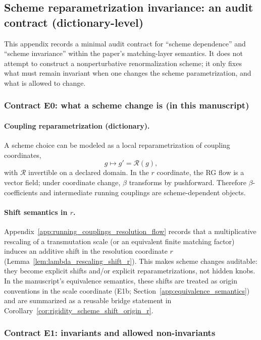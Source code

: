 \subsection{Scheme reparametrization invariance: an audit contract (dictionary-level)}
\label{app:scheme_invariance_audit_contract}

This appendix records a minimal audit contract for ``scheme dependence'' and ``scheme invariance'' within the paper's matching-layer semantics.
It does not attempt to construct a nonperturbative renormalization scheme; it only fixes what must remain invariant when one changes the scheme parametrization, and what is allowed to change.

\subsubsection{Contract E0: what a scheme change is (in this manuscript)}
\paragraph{Coupling reparametrization (dictionary).}
\MatchTag A scheme choice can be modeled as a local reparametrization of coupling coordinates,
\[
g \mapsto g'=\mathcal{R}(g),
\]
with $\mathcal{R}$ invertible on a declared domain.
In the $r$ coordinate, the RG flow is a vector field; under coordinate change, $\beta$ transforms by pushforward.
Therefore $\beta$-coefficients and intermediate running couplings are scheme-dependent objects.

\paragraph{Shift semantics in $r$.}
\MathTag Appendix~\ref{app:running_couplings_resolution_flow} records that a multiplicative rescaling of a transmutation scale (or an equivalent finite matching factor) induces an additive shift in the resolution coordinate $r$ (Lemma~\ref{lem:lambda_rescaling_shift_r}).
This makes scheme changes auditable: they become explicit shifts and/or explicit reparametrizations, not hidden knobs.
\AuditTag In the manuscript's equivalence semantics, these shifts are treated as origin conventions in the scale coordinate (E1b; Section~\ref{app:equivalence_semantics}) and are summarized as a reusable bridge statement in Corollary~\ref{cor:rigidity_scheme_shift_origin_r}.

\subsubsection{Contract E1: invariants and allowed non-invariants}

